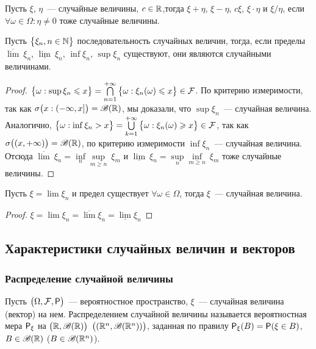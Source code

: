 \begin{consequence}
	Пусть $\xi$, $\eta$~--- случайные величины, $c \in \R$,тогда $\xi + \eta$, $\xi - \eta$, $c\xi$, $\xi \cdot \eta$ и $\xi / \eta$, если $\forall \omega \in \Omega : \eta \neq 0$ тоже случайные величины.
\end{consequence}
\begin{lemma}
	Пусть $\big\{ \xi_n, n \in \N \big\}$ последовательность случайных величин, тогда, если пределы $\overline{\lim}~\xi_n$, $\underline{\lim}~\xi_n$, $\inf\xi_n$, $\sup\xi_n$ существуют, они являются случайными величинами.
	\begin{proof}
		$\big\{\omega : \sup \xi_n \leqslant x \big\} = \bigcap\limits_{n = 1}^{+\infty}\big\{\omega : \xi_n(\omega) \leqslant x \big\} \in \F$. По критерию измеримости, так как $\sigma\big(x : (-\infty, x]\big) = \B(\R)$, мы доказали, что $\sup\xi_n$~--- случайная величина. Аналогично, $\big\{\omega : \inf \xi_n > x \big\} = \bigcup\limits_{k = 1}^{+\infty}\big\{\omega : \xi_n(\omega) \geqslant x \big\} \in \F$, так как $\sigma\big((x, +\infty)\big) = \B(\R)$, по критерию измеримости $\inf\xi_n$~--- случайная величина. Отсюда $\overline{\lim}~\xi_n = \inf\limits_n\sup\limits_{m \geqslant n}~\xi_m$ и $\underline{\lim}~\xi_n = \sup\limits_n\inf\limits_{m \geqslant n}~\xi_m$ тоже случайные величины.
	\end{proof}
\end{lemma}
\begin{consequence}
	Пусть $\xi = \lim \xi_n$ и предел существует $\forall \omega \in \Omega$, тогда $\xi$~--- случайная величина.
	\begin{proof}
	$\xi = \lim \xi_n = \overline{\lim}\xi_n = \underline{\lim} \xi_n$
	\end{proof}
\end{consequence}
\subsection{Характеристики случайных величин и векторов}
\subsubsection*{ Распределение случайной величины}
\begin{definition}
	Пусть $\big(\Omega, \F, \P \big)$~--- вероятностное пространство, $\xi$~--- случайная величина (вектор) на нем. Распределением случайной величины называется вероятностная мера $\P_\xi$ на $\big(\R, \B(\R)\big)$ $\big((\R^n, \B(\R^n))\big)$, заданная по правилу $\P_\xi(B) = \P(\xi \in B)$, $B \in \B(\R)$ ($B \in \B(\R^n)$).
\end{definition}
